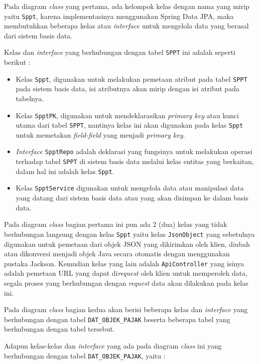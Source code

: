 \documentclass[pdftex,12pt, oneside]{article}
\begin{document}
Pada diagram \textit{class} yang pertama, ada kelompok kelas dengan nama yang mirip yaitu \texttt{Sppt}, karena implementasinya menggunakan Spring Data JPA, maka membutuhkan beberapa kelas atau \textit{interface} untuk mengelola data yang berasal dari sistem basis data.

Kelas dan \textit{interface} yang berhubungan dengan tabel \texttt{SPPT} ini adalah seperti berikut :

\begin{itemize}
	\item Kelas \texttt{Sppt}, digunakan untuk melakukan pemetaan atribut pada tabel \texttt{SPPT} pada sistem basis data, isi atributnya akan mirip dengan isi atribut pada tabelnya.
	\item Kelas \texttt{SpptPK}, digunakan untuk mendeklarasikan \textit{primary key} atau kunci utama dari tabel \texttt{SPPT}, nantinya kelas ini akan digunakan pada kelas \texttt{Sppt} untuk memetakan \textit{field-field} yang menjadi \textit{primary key}.
	\item \textit{Interface} \texttt{SpptRepo} adalah deklarasi yang fungsinya untuk melakukan operasi terhadap tabel \texttt{SPPT} di sistem basis data melalui kelas entitas yang berkaitan, dalam hal ini adalah kelas \texttt{Sppt}.
	\item Kelas \texttt{SpptService} digunakan untuk mengelola data atau manipulasi data yang datang dari sistem basis data atau yang akan disimpan ke dalam basis data.
\end{itemize}

Pada diagram \textit{class} bagian pertama ini pun ada 2 (dua) kelas yang tidak berhubungan langsung dengan kelas \texttt{Sppt} yaitu kelas \texttt{JsonObject} yang sebetulnya digunakan untuk pemetaan dari objek JSON yang dikirimkan oleh klien, diubah atau dikonversi menjadi objek Java secara otomatis dengan menggunakan pustaka Jackson. Kemudian kelas yang lain adalah \texttt{ApiController} yang isinya adalah pemetaan URL yang dapat di\textit{request} oleh klien untuk memperoleh data, segala proses yang berhubungan dengan \textit{request} data akan dilakukan pada kelas ini.

Pada diagram \textit{class} bagian kedua akan berisi beberapa kelas dan \textit{interface} yang berhubungan dengan tabel \texttt{DAT\_OBJEK\_PAJAK} beserta beberapa tabel yang berhubungan dengan tabel tersebut.

Adapun kelas-kelas dan \textit{interface} yang ada pada diagram \textit{class} ini yang berhubungan dengan tabel \texttt{DAT\_OBJEK\_PAJAK}, yaitu :
\end{document}
